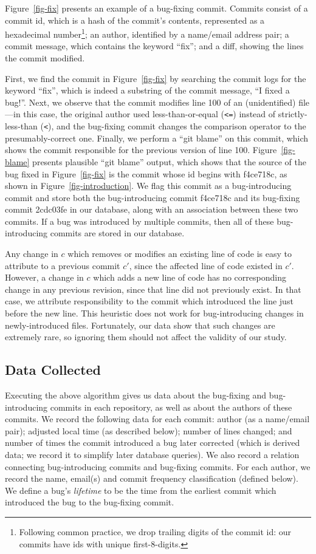 Figure~\ref{fig-fix} presents an example of a bug-fixing commit. Commits
consist of a commit id, which is a hash of the commit's contents, represented as
a hexadecimal number\footnote{Following common practice, we drop trailing
 digits of the commit id: 
 our commits have ids with unique first-8-digits.}; an author, identified by a name/email address pair; a commit
message, which contains the keyword ``fix''; and a diff, showing the lines
the commit modified.


First, we find the commit in Figure~\ref{fig-fix} by searching the commit
logs for the keyword ``fix'', which is indeed a substring of the commit message,
``I fixed a bug!''. Next, we observe that the commit modifies line 100 of
an (unidentified) file---in this case, the original author used
less-than-or-equal (\verb+<=+) instead of strictly-less-than (\verb+<+), and the
bug-fixing commit changes the comparison operator to the presumably-correct one.
Finally, we perform a ``git blame'' on this commit, which shows the commit
responsible for the previous version of line 100. Figure~\ref{fig-blame}
presents plausible ``git blame'' output, which shows that the source of the bug
fixed in Figure~\ref{fig-fix} is the commit whose id begins with f4ce718c, as
shown in Figure~\ref{fig-introduction}. We flag this commit as a
bug-introducing commit and store both the bug-introducing commit f4ce718c and
its bug-fixing commit 2cdc03fe in our database, along with an association
between these two commits. If a bug was introduced by multiple commits, 
then all of these bug-introducing commits are stored in our database. 

Any change in $c$ which removes or modifies an existing line of code is easy to
attribute to a previous commit $c'$, since the affected line of code existed in
$c'$. However, a change in $c$ which adds a new line of code has no
corresponding change in any previous revision, since that line did not
previously exist. In that case, we attribute responsibility to the commit which
introduced the line just before the new line. This heuristic does not work for
bug-introducing changes in newly-introduced files. Fortunately, our data show
that such changes are extremely rare, so ignoring them should not affect the validity of our study. 

\subsection{Data Collected}
\label{sec:data}

Executing the above algorithm gives us data about the bug-fixing and
bug-introducing commits in each repository, as well as about the authors of
these commits. We record the following data for each commit: author (as a
name/email pair); adjusted local time (as described below); number of lines changed;
and number of times the commit introduced a bug later corrected (which is
derived data; we record it to simplify later database queries). We also record a
relation connecting bug-introducing commits and bug-fixing commits. For each
author, we record the name, email(s) and 
commit frequency classification (defined below). We define a
bug's {\em lifetime} to be the time from the earliest commit which introduced 
the bug to the bug-fixing commit.

